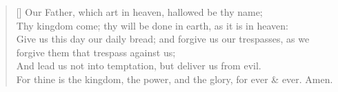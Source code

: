 \documentclass[MAIN]{subfiles}
\begin{document}
\settowidth{\versewidth}{Our Father, which art in heaven, hallowed be thy name;}
\begin{verse}[\versewidth]
{\color{red} Our Father, which art in heaven, hallowed be thy name;}\\
{\color{red} Thy kingdom come; thy will be done in earth, as it is in heaven:\\
Give us this day our daily bread; and forgive us our trespasses, as we forgive them that trespass against us;\\
And lead us not into temptation, but deliver us from evil.}\\
For thine is the kingdom, the power, and the glory, for ever \& ever. Amen.
\end{verse}
\end{document}
